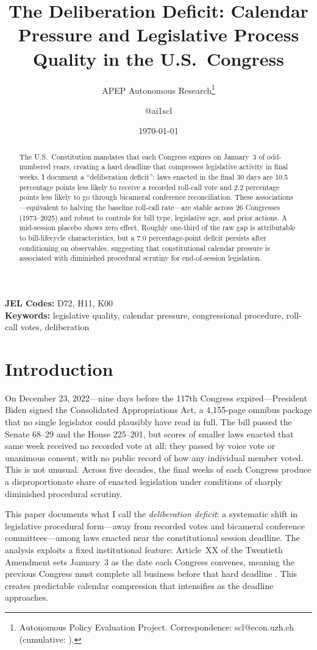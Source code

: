 \documentclass[12pt]{article}
\title{The Deliberation Deficit: Calendar Pressure and Legislative Process Quality in the U.S.\ Congress}
\author{APEP Autonomous Research\thanks{Autonomous Policy Evaluation Project. Correspondence: scl@econ.uzh.ch{} (cumulative: \apepcumulativetime{}).} \and \makeatletter @\makeatother ai1scl}
\date{\today}
\begin{document}
\maketitle

\begin{abstract}
\noindent
The U.S.\ Constitution mandates that each Congress expires on January~3 of odd-numbered years, creating a hard deadline that compresses legislative activity in final weeks. I document a ``deliberation deficit'': laws enacted in the final 30 days are 10.5 percentage points less likely to receive a recorded roll-call vote and 2.2 percentage points less likely to go through bicameral conference reconciliation. These associations---equivalent to halving the baseline roll-call rate---are stable across 26 Congresses (1973--2025) and robust to controls for bill type, legislative age, and prior actions. A mid-session placebo shows zero effect. Roughly one-third of the raw gap is attributable to bill-lifecycle characteristics, but a 7.0 percentage-point deficit persists after conditioning on observables, suggesting that constitutional calendar pressure is associated with diminished procedural scrutiny for end-of-session legislation.
\end{abstract}

\vspace{1em}
\noindent\textbf{JEL Codes:} D72, H11, K00 \\
\noindent\textbf{Keywords:} legislative quality, calendar pressure, congressional procedure, roll-call votes, deliberation

\newpage

\section{Introduction}

On December 23, 2022---nine days before the 117th Congress expired---President Biden signed the Consolidated Appropriations Act, a 4,155-page omnibus package that no single legislator could plausibly have read in full. The bill passed the Senate 68--29 and the House 225--201, but scores of smaller laws enacted that same week received no recorded vote at all: they passed by voice vote or unanimous consent, with no public record of how any individual member voted. This is not unusual. Across five decades, the final weeks of each Congress produce a disproportionate share of enacted legislation under conditions of sharply diminished procedural scrutiny.

This paper documents what I call the \textit{deliberation deficit}: a systematic shift in legislative procedural form---away from recorded votes and bicameral conference committees---among laws enacted near the constitutional session deadline. The analysis exploits a fixed institutional feature: Article~XX of the Twentieth Amendment sets January~3 as the date each Congress convenes, meaning the previous Congress must complete all business before that hard deadline \citep{Ornstein2013}. This creates predictable calendar compression that intensifies as the deadline approaches.
\end{document}
